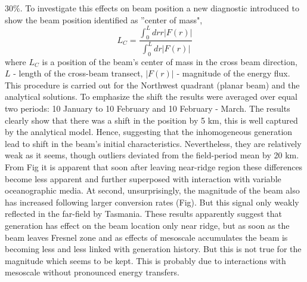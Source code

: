 \documentclass[12pt]{article}
\begin{document}
$30\%$. To investigate this effects on beam position a new diagnostic introduced to show the beam 
position identified as ''center of mass",
\begin{equation}
L_{C} = \frac{\int_0^{L} dr r |F(r)|}{\int_0^{L} dr |F(r)|}
\end{equation}
where $L_{C}$ is a position of the beam's center of mass in the cross beam direction, $L$ - length 
of the cross-beam transect, $|F(r)|$ - magnitude of the energy flux. This procedure is carried out 
for the Northwest quadrant (planar beam) and the analytical solutions. To emphasize the shift the 
results were averaged over equal two periods: 10 January to 10 February and 10 February - March. 
The results clearly show that there was a shift in the position by 5 km, this is well captured by 
the analytical model. Hence, suggesting that the inhomogeneous generation lead to shift in the 
beam's initial characteristics. Nevertheless, they are relatively weak as it seems, 
though outliers deviated from the field-period mean by 20 km. From Fig it is apparent that soon 
after leaving near-ridge region these differences become less apparent and further superposed with 
interaction with variable oceanographic media. At second, unsurprisingly, the magnitude of the beam 
also has increased following larger conversion rates (Fig). But this signal only weakly reflected 
in the far-field by Tasmania. These results apparently suggest that generation has effect on the 
beam location only near ridge, but as soon as the beam leaves Fresnel zone and as effects of 
mesoscale accumulates the beam is becoming less and less linked with generation history. But this 
is not true for the magnitude which seems to be kept. This is probably due to interactions with 
mesoscale without pronounced energy transfers.\\

\end{document}
